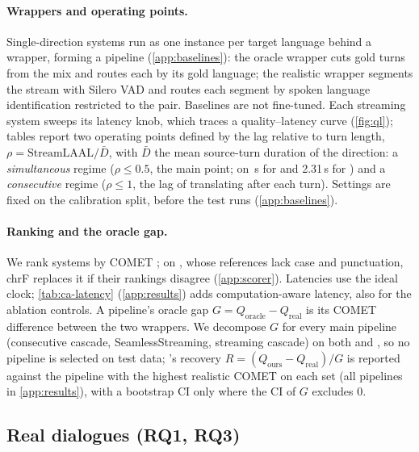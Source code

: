 \paragraph{Wrappers and operating points.}
Single-direction systems run as one instance per target language behind a wrapper, forming a pipeline (\cref{app:baselines}): the oracle wrapper cuts gold turns from the mix and routes each by its gold language; the realistic wrapper segments the stream with Silero VAD \citep{silero2024silero} and routes each segment by spoken language identification restricted to the pair.
Baselines are not fine-tuned. Each streaming system sweeps its latency knob, which traces a quality--latency curve (\cref{fig:ql}); tables report two operating points defined by the lag relative to turn length, $\rho=\mathrm{StreamLAAL}/\bar D$, with $\bar D$ the mean source-turn duration of the direction: a \emph{simultaneous} regime ($\rho\le0.5$, the main point; on \,s for \deen and 2.31\,s for \ende) and a \emph{consecutive} regime ($\rho\le1$, the lag of translating after each turn). Settings are fixed on the \syn calibration split, before the test runs (\cref{app:baselines}).

\paragraph{Ranking and the oracle gap.}
We rank systems by COMET \citep{kocmi2021ship}; on \taxi, whose references lack case and punctuation, chrF replaces it if their rankings disagree (\cref{app:scorer}).
Latencies use the ideal clock; \cref{tab:ca-latency} (\cref{app:results}) adds computation-aware latency, also for the ablation controls.
A pipeline's oracle gap $G=Q_{\mathrm{oracle}}-Q_{\mathrm{real}}$ is its COMET difference between the two wrappers. We decompose $G$ for every main pipeline (consecutive cascade, SeamlessStreaming, streaming cascade) on both \taxi and \syn, so no pipeline is selected on test data; \model's recovery $R=(Q_{\mathrm{ours}}-Q_{\mathrm{real}})/G$ is reported against the pipeline with the highest realistic COMET on each set (all pipelines in \cref{app:results}), with a bootstrap CI only where the CI of $G$ excludes 0.

\subsection{Real dialogues (RQ1, RQ3)}\label{sec:exp-real}

